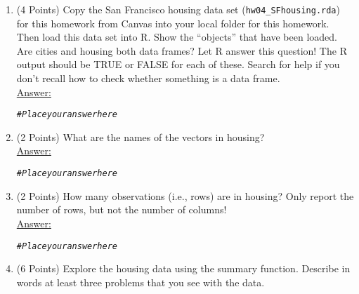 \documentclass[12pt,letterpaper,final]{article}\usepackage[]{graphicx}\usepackage[]{xcolor}
\makeatletter
\newcommand{\hlcom}[1]{\textcolor[rgb]{0.678,0.584,0.686}{\textit{#1}}}%
\newenvironment{kframe}{%
 \def\at@end@of@kframe{}%
 \ifinner\ifhmode%
  \def\at@end@of@kframe{\end{minipage}}%
  \begin{minipage}{\columnwidth}%
 \fi\fi%
 \def\FrameCommand##1{\hskip\@totalleftmargin \hskip-\fboxsep
 \colorbox{shadecolor}{##1}\hskip-\fboxsep
     \hskip-\linewidth \hskip-\@totalleftmargin \hskip\columnwidth}%
 \MakeFramed {\advance\hsize-\width
   \@totalleftmargin\z@ \linewidth\hsize
   \@setminipage}}%
 {\par\unskip\endMakeFramed%
 \at@end@of@kframe}
\newenvironment{knitrout}{}{} %
\makeatother
\begin{document}
\begin{enumerate}
\begin{enumerate}
\item (4 Points)
Copy the San Francisco housing data set (\verb|hw04_SFhousing.rda|) for this homework 
from Canvas into your local folder for this homework.
Then load this data set into R. Show the ``objects'' that have been loaded.
Are cities and housing both data frames? 
Let R answer this question!
The R output should be
TRUE or FALSE for each of these.
Search for help if you don't recall how
to check whether something is a data frame. \\

\underline{Answer:}
\begin{knitrout}
\color{fgcolor}\begin{kframe}
\begin{alltt}
\hlcom{# Place your answer here}
\end{alltt}
\end{kframe}
\end{knitrout}


\item (2 Points)
What are the names of the vectors in housing? \\

\underline{Answer:}
\begin{knitrout}
\color{fgcolor}\begin{kframe}
\begin{alltt}
\hlcom{# Place your answer here}
\end{alltt}
\end{kframe}
\end{knitrout}


\item (2 Points)
How many observations (i.e., rows) are in housing? Only report the number of rows,
but not the number of columns! \\

\underline{Answer:}
\begin{knitrout}
\color{fgcolor}\begin{kframe}
\begin{alltt}
\hlcom{# Place your answer here}
\end{alltt}
\end{kframe}
\end{knitrout}


\item (6 Points)
Explore the housing data using the summary function. 
Describe in words at least three problems that you see with the data. \\


\end{enumerate}
\end{enumerate}
\end{document}
